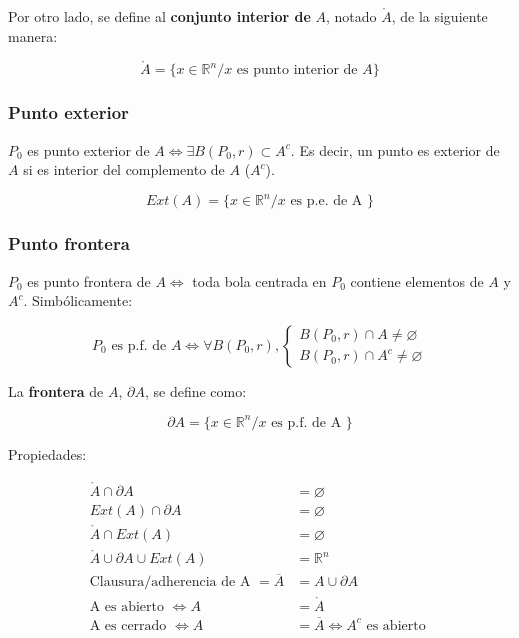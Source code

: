 \documentclass{article}
\renewcommand{\Bbb}{\mathbb}
\begin{document}
Por otro lado, se define al \textbf{conjunto interior de} $A$, notado $\mathring{A}$, de la siguiente manera:

\begin{equation}
\mathring{A} = \{ x \in \Bbb R^n / x \text{ es punto interior de } A \}
\end{equation}

\subsubsection{Punto exterior}

$P_0$ es punto exterior de $A \Longleftrightarrow \exists B(P_0, r) \subset A^c$. Es decir, un punto es exterior de $A$ si es interior del complemento de $A$ ($A^c$).

\begin{equation}
Ext(A) = \{ x \in \Bbb R^n / x \text{ es p.e. de A } \}
\end{equation}

\subsubsection{Punto frontera}

$P_0$ es punto frontera de $A \Longleftrightarrow$ toda bola centrada en $P_0$ contiene elementos de $A$ y $A^c$. Simbólicamente:

\begin{equation}
P_0 \text{ es p.f. de } A \Longleftrightarrow \forall B(P_0, r), \left\{
\begin{array}{ll}
B(P_0, r) \cap A \neq \varnothing \\
B(P_0, r) \cap A^c \neq \varnothing
\end{array}
\right.
\end{equation}

La \textbf{frontera} de $A$, $\partial A$, se define como:

\begin{equation}
\partial A = \{ x \in \Bbb R^n / x \text{ es p.f. de A } \}
\end{equation}

Propiedades:

\begin{subequations}
\begin{align}
\mathring{A} \cap \partial A & = \varnothing \\
Ext(A) \cap \partial A & = \varnothing \\
\mathring{A} \cap Ext(A) & = \varnothing \\
\mathring{A} \cup \partial A \cup Ext(A) & = \Bbb R^n \\
\text{Clausura/adherencia de A } = \overline{A} & = A \cup \partial A \\
\text{A es abierto } \Longleftrightarrow A & = \mathring{A} \\
\text{A es cerrado } \Longleftrightarrow A & = \overline{A} \Longleftrightarrow A^c \text{ es abierto } \\
\end{align}
\end{subequations}
\end{document}
